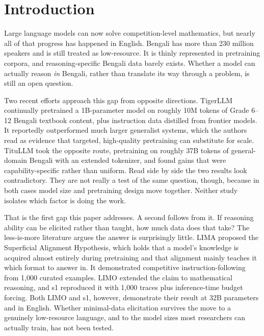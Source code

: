 %

\section{Introduction}

Large language models can now solve competition-level mathematics, but nearly
all of that progress has happened in English. Bengali has more than 230 million
speakers and is still treated as low-resource. It is thinly represented in
pretraining corpora, and reasoning-specific Bengali data barely exists. Whether
a model can actually reason \emph{in} Bengali, rather than translate its way
through a problem, is still an open question.

Two recent efforts approach this gap from opposite directions. TigerLLM
\parencite{raihan2025tigerllm} continually pretrained a 1B-parameter model on
roughly 10M tokens of Grade 6--12 Bengali textbook content, plus instruction
data distilled from frontier models. It reportedly outperformed much larger
generalist systems, which the authors read as evidence that targeted,
high-quality pretraining can substitute for scale. TituLLM
\parencite{nahin2025titullm} took the opposite route, pretraining on roughly 37B
tokens of general-domain Bengali with an extended tokenizer, and found gains
that were capability-specific rather than uniform. Read side by side the two
results look contradictory. They are not really a test of the same question,
though, because in both cases model size and pretraining design move together.
Neither study isolates which factor is doing the work.

That is the first gap this paper addresses. A second follows from it. If
reasoning ability can be elicited rather than taught, how much data does that
take? The less-is-more literature argues the answer is surprisingly little. LIMA
\parencite{zhou2023lima} %
proposed the Superficial Alignment Hypothesis, which holds that a model's
knowledge is acquired almost entirely during pretraining and that alignment
mainly teaches it which format to answer in. It demonstrated competitive
instruction-following from 1,000 curated examples. LIMO \parencite{ye2025limo}
extended the claim to mathematical reasoning, and s1
\parencite{muennighoff2025s1} reproduced it with 1,000 traces plus
inference-time budget forcing. Both LIMO and s1, however, demonstrate their
result at 32B parameters and in English. Whether minimal-data elicitation
survives the move to a genuinely low-resource language, and to the model sizes
most researchers can actually train, has not been tested.

